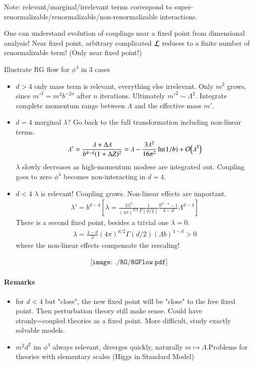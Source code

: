 Note: relevant/marginal/irrelevant terms correspond to super-renormalizable/renormalizable/non-renormalizable interactions.

One can understand evolution of couplings near a fixed point from dimensional analysis! Near fixed point, arbitrary complicated $\mathcal{L}$ reduces to a finite number of renormalizable term! (Only near fixed point!)

Illustrate RG flow for $\phi^4$ in 3 cases
\begin{itemize}
   \item \underline{$d > 4$} only mass term is relevant, everything else irrelevant. Only $m^2$ grows, since $m'^2 = m^2 b^{-2n}$ after $n$ iterations. Ultimately $m'^2 \sim \Lambda^2$. Integrate complete momentum range between $\Lambda$ and the effective mass $m'$.
   \item \underline{$d=4$} marginal $\lambda$? Go back to the full transformation including non-linear terms.
      \begin{align*}
         \lambda' = \frac{\lambda + \Delta \lambda}{b^{4-d} (1+\Delta Z)^2} = \lambda - \frac{3\lambda^2}{16\pi^2} \ln(1/b) + \order{\lambda^3}
      \end{align*}
      $\lambda$ slowly decreases as high-momentum modese are integrated out. Coupling goes to zero $\phi^4$ becomes non-interacting in $d=4$.
   \item \underline{$d < 4$} $\lambda$ is relevant! Coupling grows. Non-linear effects are important. 
      \begin{align*}
         \lambda' = b^{d-4} \left[ \lambda = \frac{3\lambda^2}{(4\pi)^{d/2}} \frac{1}{\Gamma(d/2)} \frac{b^{d-4} - 1}{4-d} \Lambda^{d-4} \right]
      \end{align*}
      There is a second fixed point, besides a trivial one $\lambda = 0$.
      \begin{align*}
         \lambda = \frac{4-d}{3} (4\pi)^{d/2} \Gamma(d/2) (\Lambda b)^{4-d} > 0
      \end{align*}
      where the non-linear effects compensate the rescaling!
\end{itemize}
\begin{align*}
   \texttt{[image: ./RG/RGFlow.pdf]}
\end{align*}

\paragraph{Remarks}
\begin{itemize}
   \item for $d<4$ but "close", the new fixed point will be "close" to the free fixed point. Then perturbation theory still make sense. Could have stronly=coupled theories as a fixed point. More difficult, study exactly solvable models.
   \item $m^2 d^2$ im $\phi^4$ always relevant, diverges quickly, naturally $m \mapsto \Lambda$.Problems for theories with elementary scales (Higgs in Standard Model)
\end{itemize}
